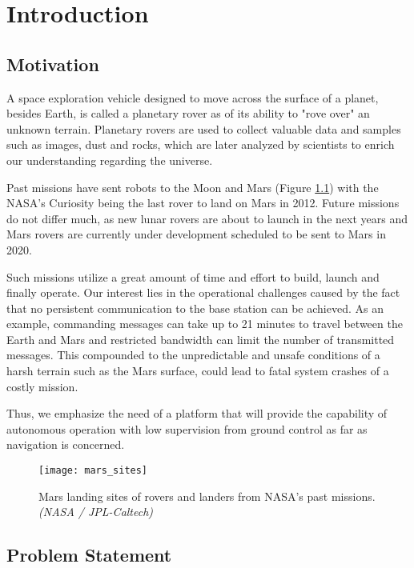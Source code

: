 \label{Chapter1}

\chapter{Introduction}

\section{Motivation}
A space exploration vehicle designed to move across the surface of a planet,
besides Earth, is called a planetary rover as of its ability to "rove over"
an unknown terrain.
Planetary rovers are used to collect valuable data and samples such as
images, dust and rocks, which are later analyzed by scientists to enrich
our understanding regarding the universe.

Past missions have sent robots to the Moon and Mars (Figure
\ref{fig:mars_sites}) with the NASA's Curiosity being the last rover to
land on Mars in 2012.
Future missions do not differ much, as new lunar rovers are about to launch
in the next years and Mars rovers are currently under development scheduled
to be sent to Mars in 2020.

Such missions utilize a great amount of time and effort to build,
launch and finally operate.
Our interest lies in the operational challenges caused by the fact
that no persistent communication to the base station can be achieved.
As an example, commanding messages can take up to 21 minutes to travel
between the Earth and Mars and restricted bandwidth can limit the number
of transmitted messages.
This compounded to the unpredictable and unsafe conditions of
a harsh terrain such as the Mars surface,
could lead to fatal system crashes of a costly mission.

Thus, we emphasize the need of a platform that will provide the
capability of autonomous operation with low supervision from ground control
as far as navigation is concerned.

\begin{figure}[h!]
    \centering
    \texttt{[image: mars\_sites]}
    \caption[Mars landing sites]{
        Mars landing sites of rovers and landers from NASA's past missions.
        \textit{(NASA / JPL-Caltech)}
    }
    \label{fig:mars_sites}
\end{figure}

\section{Problem Statement}

